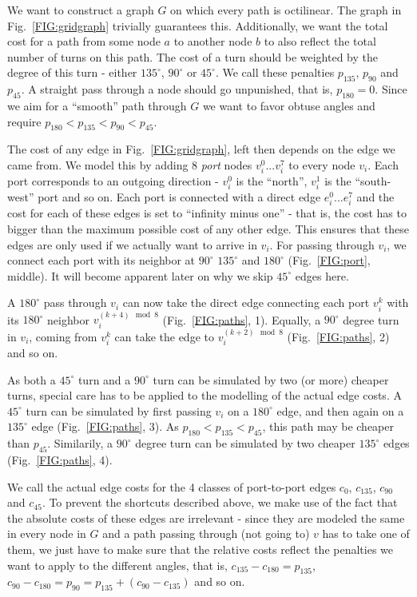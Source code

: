\documentclass{sig-alternate-sigmod09}
\begin{document}
We want to construct a graph $G$ on which every path is octilinear. The graph in Fig.~\ref{FIG:gridgraph} trivially guarantees this. Additionally, we want the total cost for a path from some node $a$ to another node $b$ to also reflect the total number of turns on this path. The cost of a turn should be weighted by the degree of this turn - either $135^{\circ}$, $90^{\circ}$ or $45^{\circ}$. We call these penalties $p_{135}$, $p_{90}$ and $p_{45}$. A straight pass through a node should go unpunished, that is, $p_{180} = 0$. Since we aim for a ``smooth'' path through $G$ we want to favor obtuse angles and require $p_{180} < p_{135} < p_{90} < p_{45}$.

The cost of any edge in Fig.~\ref{FIG:gridgraph}, left then depends on the edge we came from. We model this by adding 8 \emph{port} nodes $v_i^0 ... v_i^7$ to every node $v_i$. Each port corresponds to an outgoing direction - $v_i^0$ is the ``north'', $v_i^1$ is the ``south-west'' port and so on. Each port is connected with a direct edge $e_i^0 ... e_i^7$ and the cost for each of these edges is set to ``infinity minus one'' - that is, the cost has to bigger than the maximum possible cost of any other edge. This ensures that these edges are only used if we actually want to arrive in $v_i$. For passing through $v_i$, we connect each port with its neighbor at $90^{\circ}$ $135^{\circ}$ and $180^{\circ}$ (Fig.~\ref{FIG:port}, middle). It will become apparent later on why we skip $45^{\circ}$ edges here.

A $180^{\circ}$ pass through $v_i$ can now take the direct edge connecting each port $v_i^k$ with its $180^{\circ}$ neighbor $v_i^{(k + 4) \mod 8}$ (Fig.~\ref{FIG:paths}, 1). Equally, a $90^{\circ}$ degree turn in $v_i$, coming from $v_i^k$ can take the edge to $v_i^{(k + 2) \mod 8}$ (Fig.~\ref{FIG:paths}, 2) and so on.

As both a $45^{\circ}$ turn and a $90^{\circ}$ turn can be simulated by two (or more) cheaper turns, special care has to be applied to the modelling of the actual edge costs. A $45^{\circ}$ turn can be simulated by first passing $v_i$ on a $180^{\circ}$ edge, and then again on a $135^{\circ}$ edge (Fig.~\ref{FIG:paths}, 3). As $p_{180} < p_{135} < p_{45}$, this path may be cheaper than $p_{45}$. Similarily, a $90^{\circ}$ degree turn can be simulated by two cheaper $135^{\circ}$ edges (Fig.~\ref{FIG:paths}, 4).

We call the actual edge costs for the 4 classes of port-to-port edges $c_0$, $c_{135}$, $c_{90}$ and $c_{45}$. To prevent the shortcuts described above, we make use of the fact that the absolute costs of these edges are irrelevant - since they are modeled the same in every node in $G$ and a path passing through (not going to) $v$ has to take one of them, we just have to make sure that the relative costs reflect the penalties we want to apply to the different angles, that is, $c_{135} - c_{180} = p_{135}$, $c_{90} - c_{180} = p_{90} = p_{135} + (c_{90}-c_{135})$ and so on. 
\end{document}
